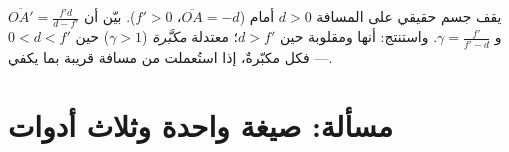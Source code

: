 \begin{exercise}[$\star\star\star$]\label{exo:g11:lenses-and-eye:15}
يقف جسم حقيقي على المسافة $d > 0$ أمام 
($\overline{OA} = -d$، $f' > 0$). بيّن أن
$\overline{OA'} = \frac{f'd}{d - f'}$ و
$\gamma = \frac{f'}{f' - d}$. واستنتج: أنها  ومقلوبة حين $d > f'$؛
 معتدلة \emph{مكبَّرة} ($\gamma > 1$) حين $0 < d < f'$ ---
فكل  مكبّرةٌ، إذا استُعملت من مسافة قريبة بما يكفي.
\end{exercise}

\section{مسألة: صيغة واحدة وثلاث أدوات}

